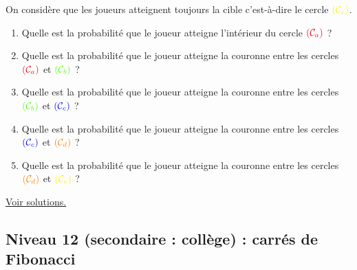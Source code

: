 \documentclass[11pt]{article}
\begin{document}
On considère que les joueurs atteignent toujours la cible c'est-à-dire
le cercle \(\textcolor{yellow}{(\mathcal{C}_e)}\).


\begin{enumerate}
\item Quelle est la probabilité que le joueur atteigne l'intérieur du
cercle \(\textcolor{red}{(\mathcal{C}_a)}\) ?
\item Quelle est la probabilité que le joueur atteigne la couronne entre
les cercles \(\textcolor{red}{(\mathcal{C}_a)}\) et
\(\textcolor{lime}{(\mathcal{C}_b)}\) ?
\item Quelle est la probabilité que le joueur atteigne la couronne entre
les cercles \(\textcolor{lime}{(\mathcal{C}_b)}\) et
\(\textcolor{navy}{(\mathcal{C}_c)}\) ?
\item Quelle est la probabilité que le joueur atteigne la couronne entre
les cercles \(\textcolor{navy}{(\mathcal{C}_c)}\) et
\(\textcolor{orange}{(\mathcal{C}_d)}\) ?
\item Quelle est la probabilité que le joueur atteigne la couronne entre
les cercles \(\textcolor{orange}{(\mathcal{C}_d)}\) et
\(\textcolor{yellow}{(\mathcal{C}_e)}\) ?
\end{enumerate}



\hyperref[orgb3549e5]{Voir solutions.}




\newpage

\subsection{Niveau 12 (secondaire : collège) : carrés de Fibonacci}
\label{sec:org625f746}

\label{org1a7aca1}
\end{document}
